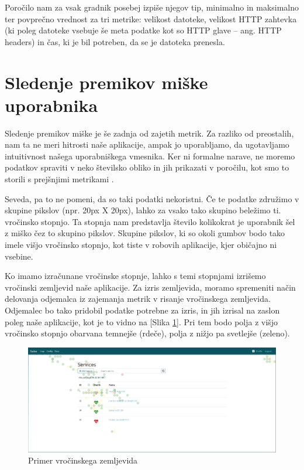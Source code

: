 \documentclass[a4paper, 12pt]{book}
\begin{document}
Poročilo nam za vsak gradnik posebej izpiše njegov tip, minimalno in maksimalno ter povprečno vrednost za tri metrike: velikost datoteke, velikost HTTP zahtevka (ki poleg datoteke vsebuje še meta podatke kot so HTTP glave -- ang. HTTP headers) in čas, ki je bil potreben, da se je datoteka prenesla.

\section{Sledenje premikov miške uporabnika}
\label{ch2:sec4}

Sledenje premikov miške je še zadnja od zajetih metrik. Za razliko od preostalih, nam ta ne meri hitrosti naše aplikacije, ampak jo uporabljamo, da ugotavljamo intuitivnost našega uporabniškega vmesnika. Ker ni formalne narave, ne moremo podatkov spraviti v neko številsko obliko in jih prikazati v poročilu, kot smo to storili s prejšnjimi metrikami \cite{ux_book}.

Seveda, pa to ne pomeni, da so taki podatki nekoristni. Če te podatke združimo v skupine pikslov (npr. 20px X 20px), lahko za vsako tako skupino beležimo ti. vročinsko stopnjo. Ta stopnja nam predstavlja število kolikokrat je uporabnik šel z miško čez to skupino pikslov. Skupine pikslov, ki so okoli gumbov bodo tako imele višjo vročinsko stopnjo, kot tiste v robovih aplikacije, kjer običajno ni vsebine.

Ko imamo izračunane vročinske stopnje, lahko s temi stopnjami izrišemo vročinski zemljevid naše aplikacije. Za izris zemljevida, moramo spremeniti način delovanja odjemalca iz zajemanja metrik v risanje vročinskega zemljevida. Odjemalec bo tako pridobil podatke potrebne za izris, in jih izrisal na zaslon poleg naše aplikacije, kot je to vidno na [Slika \ref{img:heatmap}]. Pri tem bodo polja z višjo vročinsko stopnjo obarvana temnejše (rdeče), polja z nižjo pa svetlejše (zeleno).

\begin{figure}[h]
	\begin{center}
		\includegraphics[width=1\textwidth]{heatmap_1.png}
	\end{center}
	\caption{Primer vročinskega zemljevida}
	\label{img:heatmap}
\end{figure}
\end{document}

